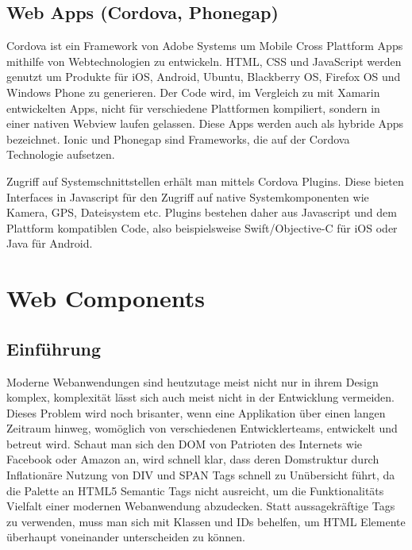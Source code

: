 \newpage


\subsection{Web Apps (Cordova, Phonegap)}

Cordova ist ein Framework von Adobe Systems um Mobile Cross Plattform Apps mithilfe von Webtechnologien zu entwickeln.
HTML, CSS und JavaScript werden genutzt um Produkte für iOS, Android, Ubuntu, Blackberry OS, Firefox OS und Windows Phone zu generieren.\cite{Cordo26:online}
Der Code wird, im Vergleich zu mit Xamarin entwickelten Apps, nicht für verschiedene Plattformen kompiliert,
sondern in einer nativen Webview laufen gelassen. Diese Apps werden auch als hybride Apps bezeichnet.
Ionic und Phonegap sind Frameworks, die auf der Cordova Technologie aufsetzen.

Zugriff auf Systemschnittstellen erhält man mittels Cordova Plugins. Diese bieten
Interfaces in Javascript für den Zugriff auf native Systemkomponenten wie Kamera, GPS, Dateisystem etc.
Plugins bestehen daher aus Javascript und dem Plattform kompatiblen Code,
also beispielsweise Swift/Objective-C für iOS oder Java für Android.

\vspace{1cm}

\vspace{1cm}

\newpage
\section{Web Components}


\subsection{Einführung}

Moderne Webanwendungen sind heutzutage meist nicht nur in ihrem Design komplex, komplexität lässt sich auch meist nicht in der Entwicklung
vermeiden. Dieses Problem wird noch brisanter, wenn eine Applikation über einen langen Zeitraum hinweg,
womöglich von verschiedenen Entwicklerteams, entwickelt und betreut wird. Schaut man sich den DOM von Patrioten des Internets wie Facebook oder Amazon an,
wird schnell klar, dass deren Domstruktur durch Inflationäre Nutzung von DIV und SPAN Tags schnell zu Unübersicht führt,
da die Palette an HTML5 Semantic Tags nicht ausreicht, um die Funktionalitäts Vielfalt einer modernen Webanwendung abzudecken.
Statt aussagekräftige Tags zu verwenden, muss man sich mit Klassen und IDs behelfen, um HTML Elemente überhaupt voneinander unterscheiden zu können.
\cite{sitepoint-introduction-to-webcomponents}

